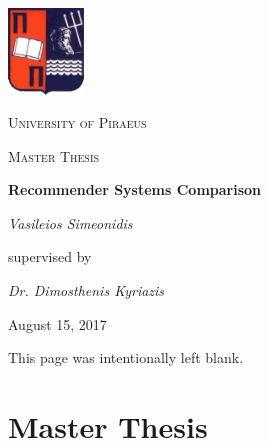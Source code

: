 \documentclass{article}
\begin{document}
	\begin{titlepage}
		\centering
		\includegraphics[width=0.15\textwidth]{images/UniversityOfPiraeusLogo.png}\par\vspace{1cm}
		{\scshape\LARGE University of Piraeus \par}
		\vspace{1cm}
		{\scshape\Large Master Thesis\par}
		\vspace{1.5cm}
		{\huge\bfseries Recommender Systems Comparison\par}
		\vspace{2cm}
		{\Large\itshape Vasileios Simeonidis\par}
		\vspace{7cm}
		supervised by\par
		\textit{Dr. Dimosthenis Kyriazis}
		\vfill
		{\large August 15, 2017\par}
	\end{titlepage}


\newpage
\tableofcontents
{}
\newpage
{}
\begin{center}
This page was intentionally left blank.
\end{center}
\newpage
{}

\part{Master Thesis}





\newpage



\end{document}
